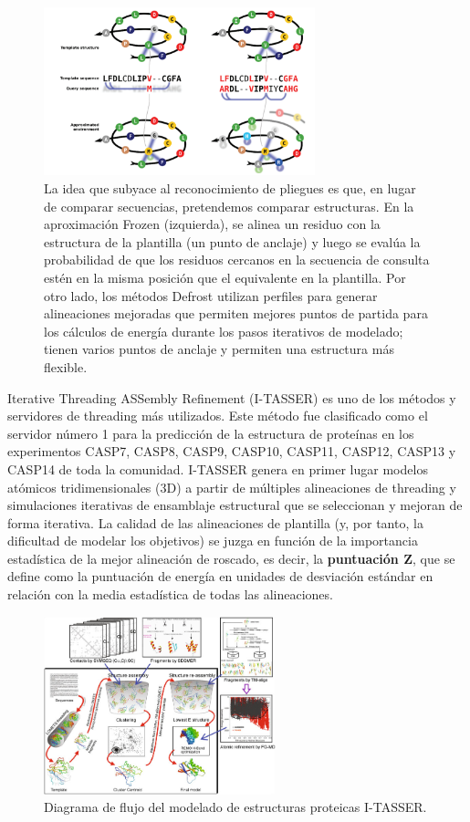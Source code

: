 \begin{figure}[h]
\centering
\includegraphics[width = 0.7\textwidth]{figs/fr.png}
\caption{La idea que subyace al reconocimiento de pliegues es que, en lugar de comparar secuencias, pretendemos comparar estructuras. En la aproximación Frozen (izquierda), se alinea un residuo con la estructura de la plantilla (un punto de anclaje) y luego se evalúa la probabilidad de que los residuos cercanos en la secuencia de consulta estén en la misma posición que el equivalente en la plantilla. Por otro lado, los métodos Defrost utilizan perfiles para generar alineaciones mejoradas que permiten mejores puntos de partida para los cálculos de energía durante los pasos iterativos de modelado; tienen varios puntos de anclaje y permiten una estructura más flexible. }
\end{figure}

Iterative Threading ASSembly Refinement (I-TASSER) es uno de los métodos y servidores de threading más utilizados. Este método fue clasificado como el servidor número 1 para la predicción de la estructura de proteínas en los experimentos CASP7, CASP8, CASP9, CASP10, CASP11, CASP12, CASP13 y CASP14 de toda la comunidad. I-TASSER genera en primer lugar modelos atómicos tridimensionales (3D) a partir de múltiples alineaciones de threading y simulaciones iterativas de ensamblaje estructural que se seleccionan y mejoran de forma iterativa. La calidad de las alineaciones de plantilla (y, por tanto, la dificultad de modelar los objetivos) se juzga en función de la importancia estadística de la mejor alineación de roscado, es decir, la \textbf{puntuación Z}, que se define como la puntuación de energía en unidades de desviación estándar en relación con la media estadística de todas las alineaciones.

\begin{figure}[h]
\centering
\includegraphics[width = 0.6\textwidth]{figs/paste-29011FF5.png}
\caption{Diagrama de flujo del modelado de estructuras proteicas I-TASSER.}
\end{figure}

